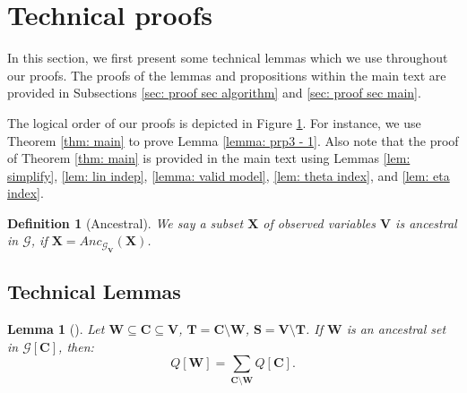 \documentclass[accepted]{uai2022}
\newtheorem{lemma}{Lemma}
\newtheorem{definition}{Definition}
\newcommand{\Anc}[2]{\textit{Anc}_{#2}(#1)}
\newcommand{\V}[0]{\mathbf{V}}
\newcommand{\C}[0]{\mathbf{C}}
\newcommand{\W}[0]{\mathbf{W}}
\newcommand{\X}[0]{\mathbf{X}}
\newcommand{\T}[0]{\mathbf{T}}
\newcommand{\G}[0]{\mathcal{G}}
\begin{document}
\section{Technical proofs} \label{sec: apd_proof}

    \begin{figure}[omitted: a diagram of this paper's results, not reproduced here]\label{fig: logic order}\end{figure}

    In this section, we first present some technical lemmas which we use throughout our proofs.
    The proofs of the lemmas and propositions within the main text are provided in Subsections \ref{sec: proof sec algorithm} and  \ref{sec: proof sec main}. 
    
    The logical order of our proofs is depicted in Figure \ref{fig: logic order}. For instance, we use Theorem \ref{thm: main} to prove Lemma \ref{lemma: prp3 - 1}. 
    Also note that the proof of Theorem \ref{thm: main} is provided in the main text using Lemmas \ref{lem: simplify}, \ref{lem: lin indep}, \ref{lemma: valid model}, \ref{lem: theta index}, and \ref{lem: eta index}. 
    
    \begin{definition}[Ancestral]
        We say a subset $\X$ of observed variables $\V$ is ancestral in $\G$, if $\X = \Anc{\X}{\G_{\V}}$.
    \end{definition}

    
    \subsection{Technical Lemmas}
        \begin{lemma}[\citep{tian2003ID}]\label{lemma: Q-marginal}
            Let $\W \subseteq \C \subseteq \V$, $\T = \C \setminus \W$, $\mathbf{S}=\V \setminus \T$. 
            If $\W$ is an ancestral set in $\G[\C]$, then:
            \begin{equation*}
                Q[\W] = \sum_{\C \setminus \W}Q[\C].
            \end{equation*}
        \end{lemma}
        
\end{document}
